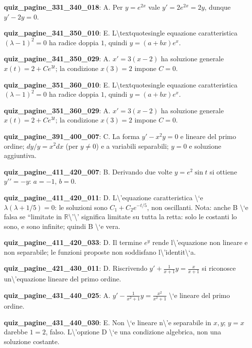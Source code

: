 \documentclass[11pt,a4paper]{article}
\newcounter{quiz}
\begin{document}
\noindent\textbf{quiz\_pagine\_331\_340\_018}: A. Per $y=e^{2x}$ vale $y\prime=2e^{2x}=2y$, dunque $y\prime-2y=0$.\par\medskip
\noindent\textbf{quiz\_pagine\_341\_350\_010}: E. L\textbackslash{}textquotesingle equazione caratteristica $(\lambda-1)^2=0$ ha radice doppia $1$, quindi $y=(a+bx)e^x$.\par\medskip
\noindent\textbf{quiz\_pagine\_341\_350\_029}: A. $x\prime=3(x-2)$ ha soluzione generale $x(t)=2+Ce^{3t}$; la condizione $x(3)=2$ impone $C=0$.\par\medskip
\noindent\textbf{quiz\_pagine\_351\_360\_010}: E. L\textbackslash{}textquotesingle equazione caratteristica $(\lambda-1)^2=0$ ha radice doppia $1$, quindi $y=(a+bx)e^x$.\par\medskip
\noindent\textbf{quiz\_pagine\_351\_360\_029}: A. $x\prime=3(x-2)$ ha soluzione generale $x(t)=2+Ce^{3t}$; la condizione $x(3)=2$ impone $C=0$.\par\medskip
\noindent\textbf{quiz\_pagine\_391\_400\_007}: C. La forma $y\prime-x^2y=0$ e lineare del primo ordine; $dy/y=x^2dx$ (per $y\neq0$) e a variabili separabili; $y=0$ e soluzione aggiuntiva.\par\medskip
\noindent\textbf{quiz\_pagine\_411\_420\_007}: B. Derivando due volte $y=e^2\sin t$ si ottiene $y\prime\prime=-y$: $a=-1$, $b=0$.\par\medskip
\noindent\textbf{quiz\_pagine\_411\_420\_011}: D. L\textbackslash{}'equazione caratteristica \textbackslash{}`e $\lambda(\lambda+1/5)=0$: le soluzioni sono $C_1+C_2e^{-t/5}$, non oscillanti. Nota: anche B \textbackslash{}`e falsa se ``limitate in $\mathbb R$\textbackslash{}'\textbackslash{}' significa limitate su tutta la retta: solo le costanti lo sono, e sono infinite; quindi B \textbackslash{}`e vera.\par\medskip
\noindent\textbf{quiz\_pagine\_411\_420\_033}: D. Il termine $e^y$ rende l\textbackslash{}'equazione non lineare e non separabile; le funzioni proposte non soddisfano l\textbackslash{}'identit\textbackslash{}`a.\par\medskip
\noindent\textbf{quiz\_pagine\_421\_430\_011}: D. Riscrivendo $y\prime+\frac{1}{x+1}y=\frac{x}{x+1}$ si riconosce un\textbackslash{}'equazione lineare del primo ordine.\par\medskip
\noindent\textbf{quiz\_pagine\_431\_440\_025}: A. $y\prime-\frac{1}{x^2+1}y=\frac{x^2}{x^2+1}$ \textbackslash{}`e lineare del primo ordine.\par\medskip
\noindent\textbf{quiz\_pagine\_431\_440\_030}: E. Non \textbackslash{}`e lineare n\textbackslash{}'e separabile in $x,y$; $y=x$ darebbe $1=2$, falso. L\textbackslash{}'opzione D \textbackslash{}`e una condizione algebrica, non una soluzione costante.\par\medskip
\end{document}
